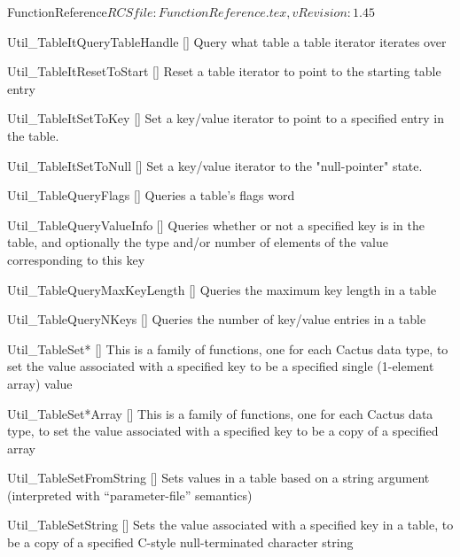 \begin{cactuspart}{5}{FunctionReference}{$RCSfile: FunctionReference.tex,v $}{$Revision: 1.45 $}
\begin{Lentry}
\item[Util\_TableItQueryTableHandle]
     [\pageref{Util-TableItQueryTableHandle}]
Query what table a table iterator iterates over

\item[Util\_TableItResetToStart]
     [\pageref{Util-TableItResetToStart}]
Reset a table iterator to point to the starting table entry

\item[Util\_TableItSetToKey]
     [\pageref{Util-TableItSetToKey}]
Set a key/value iterator to point to a specified entry in the table.

\item[Util\_TableItSetToNull]
     [\pageref{Util-TableItSetToNull}]
Set a key/value iterator to the "null-pointer" state.

\item[Util\_TableQueryFlags]
     [\pageref{Util-TableQueryFlags}]
Queries a table's flags word

\item[Util\_TableQueryValueInfo]
     [\pageref{Util-TableQueryValueInfo}]
Queries whether or not a specified key is in the table, and optionally
the type and/or number of elements of the value corresponding to this key

\item[Util\_TableQueryMaxKeyLength]
     [\pageref{Util-TableQueryMaxKeyLength}]
Queries the maximum key length in a table

\item[Util\_TableQueryNKeys]
     [\pageref{Util-TableQueryNKeys}]
Queries the number of key/value entries in a table

\item[Util\_TableSet*]
     [\pageref{Util-TableSet*}]
This is a family of functions, one for each Cactus data type,
to set the value associated with a specified key to be a specified
single (1-element array) value

\item[Util\_TableSet*Array]
     [\pageref{Util-TableSet*Array}]
This is a family of functions, one for each Cactus data type,
to set the value associated with a specified key to be a copy
of a specified array

\item[Util\_TableSetFromString]
     [\pageref{Util-TableSetFromString}]
Sets values in a table based on a string argument (interpreted with
``parameter-file'' semantics)

\item[Util\_TableSetString]
     [\pageref{Util-TableSetString}]
Sets the value associated with a specified key in a table, to be
a copy of a specified C-style null-terminated character string


\end{Lentry}
\end{cactuspart}
